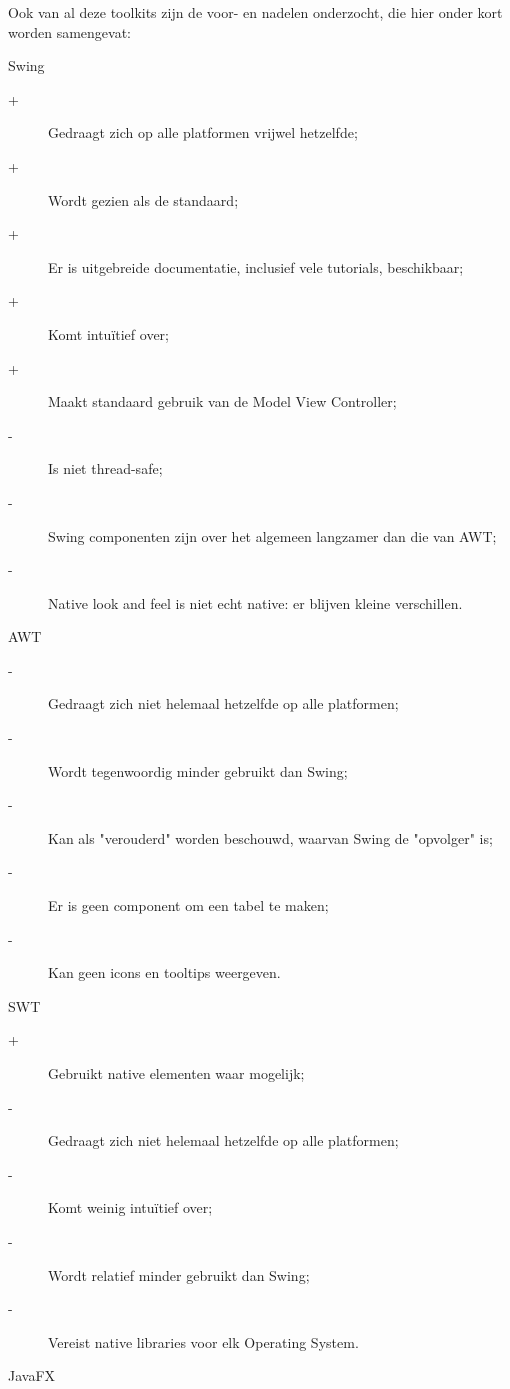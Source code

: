 \documentclass[a4paper,11pt]{article}
\begin{document}
Ook van al deze toolkits zijn de voor- en nadelen onderzocht, die hier onder kort worden samengevat:\\
\begin{description}
	\item Swing
		\begin{description}
			\item[+] Gedraagt zich op alle platformen vrijwel hetzelfde;
			\item[+] Wordt gezien als de standaard;
			\item[+] Er is uitgebreide documentatie, inclusief vele tutorials, beschikbaar;
			\item[+] Komt intuïtief over;
			\item[+] Maakt standaard gebruik van de Model View Controller;
			\item[-] Is niet thread-safe;
			\item[-] Swing componenten zijn over het algemeen langzamer dan die van AWT;
			\item[-] Native look and feel is niet echt native: er blijven kleine verschillen.
		\end{description}
	\item AWT
		\begin{description} 
			\item[-] Gedraagt zich niet helemaal hetzelfde op alle platformen;
			\item[-] Wordt tegenwoordig minder gebruikt dan Swing;
			\item[-] Kan als "verouderd" worden beschouwd, waarvan Swing de "opvolger" is;
			\item[-] Er is geen component om een tabel te maken;
			\item[-] Kan geen icons en tooltips weergeven.
		\end{description}
	\item SWT
		\begin{description}
			\item[+] Gebruikt native elementen waar mogelijk;
			\item[-] Gedraagt zich niet helemaal hetzelfde op alle platformen;
			\item[-] Komt weinig intuïtief over;
			\item[-] Wordt relatief minder gebruikt dan Swing;
			\item[-] Vereist native libraries voor elk Operating System.
		\end{description}
	\item JavaFX
		\begin{description}

\end{description}
\end{description}
\end{document}
